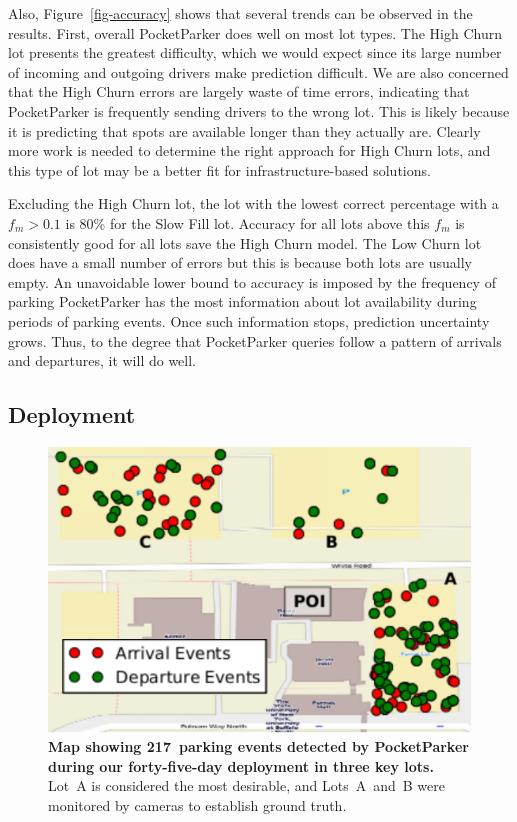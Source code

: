 Also, Figure~\ref{fig-accuracy} shows that several trends can be observed in
the results. First, overall PocketParker does well on most lot types. The
High Churn lot presents the greatest difficulty, which we would expect since
its large number of incoming and outgoing drivers make prediction difficult.
We are also concerned that the High Churn errors are largely waste of time
errors, indicating that PocketParker is frequently sending drivers to the
wrong lot. This is likely because it is predicting that spots are available
longer than they actually are. Clearly more work is needed to determine the
right approach for High Churn lots, and this type of lot may be a better fit
for infrastructure-based solutions.

Excluding the High Churn lot, the lot with the lowest correct percentage with
a $f_m > 0.1$ is 80\% for the Slow Fill lot.  Accuracy for all lots above
this $f_m$ is consistently good for all lots save the High Churn model.  The
Low Churn lot does have a small number of errors but this is because both
lots are usually empty. An unavoidable lower bound to accuracy is imposed by
the frequency of parking PocketParker has the most information about lot
availability during periods of parking events. Once such information stops,
prediction uncertainty grows. Thus, to the degree that PocketParker queries
follow a pattern of arrivals and departures, it will do well.

\subsection{Deployment}

\begin{figure}
\centering
\includegraphics[width=\columnwidth]{./figures/smallEventsOnThreeParkingLot.pdf}

\caption{\textbf{Map showing 217~parking events detected by PocketParker
during our forty-five-day deployment in three key lots.} Lot~A is considered
the most desirable, and Lots~A~and~B were monitored by cameras to establish
ground truth.}

\label{fig-events}
\end{figure}

